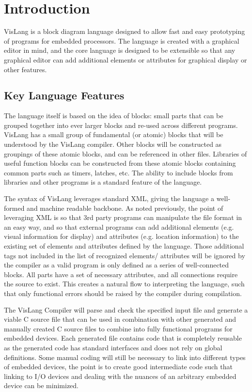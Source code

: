 \section{Introduction}

VisLang is a block diagram language designed to allow fast and
easy prototyping of programs for embedded processors. The language is created
with a graphical editor in mind, and the core language is designed to be extensible
so that any graphical editor can add additional elements or attributes for graphical
display or other features.

\subsection{Key Language Features}

The language itself is based on the idea of blocks: small parts that can be grouped
together into ever larger blocks and re-used across different programs. VisLang has a
small group of fundamental (or atomic) blocks that will be understood by the VisLang
compiler. Other blocks will be constructed as groupings of these atomic blocks, and can
be referenced in other files. Libraries of useful function blocks can be constructed
from these atomic blocks containing common parts such as timers, latches, etc. The 
ability to include blocks from libraries and other programs is a standard feature of
the language.

The syntax of VisLang leverages standard XML, giving the language a well-formed and 
machine readable backbone. As noted previously, the point of leveraging XML is so that
3rd party programs can manipulate the file format in an easy way, and so that external
programs can add additional elements (e.g. visual information for display) and attributes
(e.g. location information) to the existing set of elements and attributes defined by
the language. Those additional tags not included in the list of recognized elements/
attributes will be ignored by the compiler as a valid program is only defined as a series
of well-connected blocks. All parts have a set of necessary attributes, and all connections
require the source to exist. This creates a natural flow to interpreting the language, such
that only functional errors should be raised by the compiler during compilation.

The VisLang Compiler will parse and check the specified input file and generate a viable
C source file that can be used in combination with other generated and manually created
C source files to combine into fully functional programs for embedded devices. Each
generated file contains code that is completely reusable as the generated code has standard
interfaces and does not rely on global definitions. Some manual coding will still be
necessary to link into different types of embedded devices, the point is to create good
intermediate code such that linking to I/O devices and dealing with the nuances of an
arbitrary embedded device can be minimized.
